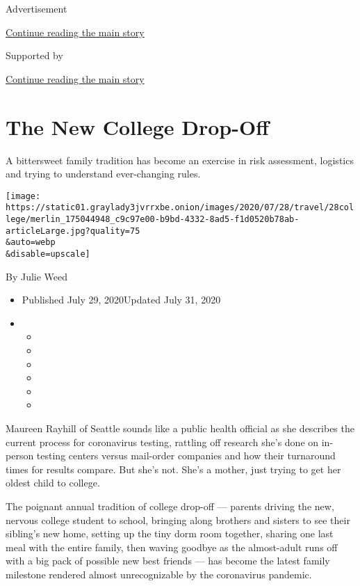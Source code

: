 Advertisement

\protect\hyperlink{after-top}{Continue reading the main story}

Supported by

\protect\hyperlink{after-sponsor}{Continue reading the main story}

\hypertarget{the-new-college-drop-off}{%
\section{The New College Drop-Off}\label{the-new-college-drop-off}}

A bittersweet family tradition has become an exercise in risk
assessment, logistics and trying to understand ever-changing rules.

\texttt{[image: https://static01.graylady3jvrrxbe.onion/images/2020/07/28/travel/28college/merlin\_175044948\_c9c97e00-b9bd-4332-8ad5-f1d0520b78ab-articleLarge.jpg?quality=75\\\&auto=webp\\\&disable=upscale]}

By Julie Weed

\begin{itemize}
\item
  Published July 29, 2020Updated July 31, 2020
\item
  \begin{itemize}
  \item
  \item
  \item
  \item
  \item
  \item
  \end{itemize}
\end{itemize}

Maureen Rayhill of Seattle sounds like a public health official as she
describes the current process for coronavirus testing, rattling off
research she's done on in-person testing centers versus mail-order
companies and how their turnaround times for results compare. But she's
not. She's a mother, just trying to get her oldest child to college.

The poignant annual tradition of college drop-off --- parents driving
the new, nervous college student to school, bringing along brothers and
sisters to see their sibling's new home, setting up the tiny dorm room
together, sharing one last meal with the entire family, then waving
goodbye as the almost-adult runs off with a big pack of possible new
best friends --- has become the latest family milestone rendered almost
unrecognizable by the coronavirus pandemic.


